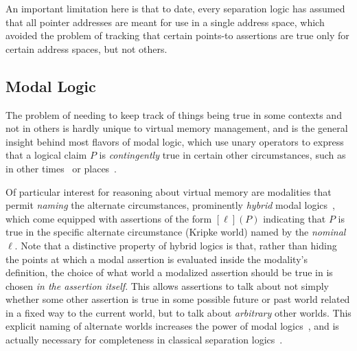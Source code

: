 An important limitation here is that to date, every separation logic
has assumed that all pointer addresses are meant for use in a single address space, which avoided the
problem of tracking that certain points-to assertions are true only for certain address spaces, but not others.

\subsection{Modal Logic}
\label{sec:backgroundonmodallogic}
The problem of needing to keep track of things being true in some contexts and not in others is hardly unique to virtual 
memory management, and is the general insight behind most flavors of modal logic, which use
unary operators to express that a logical claim $P$ is \emph{contingently} true 
in certain other circumstances, such as in other times~\cite{pnueli1977temporal} or places~\cite{murphy2008type,gordon2019modal}.


Of particular interest for reasoning about virtual memory are modalities that permit \emph{naming} the alternate 
circumstances, prominently \emph{hybrid} modal logics~\cite{blackburn1995hybrid,areces2001hybrid}, which come equipped 
with assertions of the form $[\ell](P)$ indicating that $P$ is true in the specific alternate circumstance (Kripke world)
 named by the \emph{nominal} $\ell$. Note that a distinctive property of hybrid logics is that, rather than hiding
the points at which a modal assertion is evaluated inside the modality's definition, the choice of what world a modalized
assertion should be true in is chosen \emph{in the assertion itself}. This allows assertions to talk about not simply whether some other assertion
is true in some possible future or past world related in a fixed way to the current world, but to talk about \emph{arbitrary}
other worlds. This explicit naming of alternate worlds increases the power of modal logics~\cite{blackburn1995hybrid}, and is actually
necessary for completeness in classical separation logics~\cite{brotherston2014parametric}.

